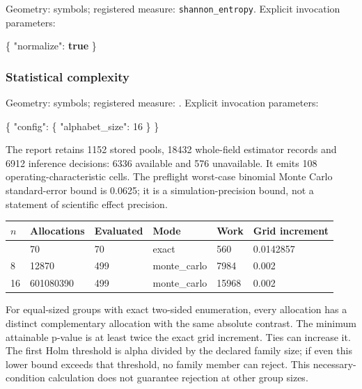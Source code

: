 \documentclass[
  english,
  11pt,
]{article}
\newenvironment{Shaded}{}{}
\newcommand{\DataTypeTok}[1]{\textcolor[rgb]{0.56,0.13,0.00}{#1}}
\newcommand{\DecValTok}[1]{\textcolor[rgb]{0.25,0.63,0.44}{#1}}
\newcommand{\FunctionTok}[1]{\textcolor[rgb]{0.02,0.16,0.49}{#1}}
\newcommand{\KeywordTok}[1]{\textcolor[rgb]{0.00,0.44,0.13}{\textbf{#1}}}
\newcounter{none} %
\begin{document}
Geometry: symbols; registered measure: \texttt{shannon\_entropy}.
Explicit invocation parameters:

\begin{Shaded}
\begin{Highlighting}[]
\FunctionTok{\{}
  \DataTypeTok{"normalize"}\FunctionTok{:} \KeywordTok{true}
\FunctionTok{\}}
\end{Highlighting}
\end{Shaded}

\subsubsection{Statistical complexity}\label{statistical-complexity}

Geometry: symbols; registered measure: .
Explicit invocation parameters:

\begin{Shaded}
\begin{Highlighting}[]
\FunctionTok{\{}
  \DataTypeTok{"config"}\FunctionTok{:} \FunctionTok{\{}
    \DataTypeTok{"alphabet\_size"}\FunctionTok{:} \DecValTok{16}
  \FunctionTok{\}}
\FunctionTok{\}}
\end{Highlighting}
\end{Shaded}

The report retains 1152 stored pools, 18432 whole-field estimator
records and 6912 inference decisions: 6336 available and 576
unavailable. It emits 108 operating-characteristic cells. The preflight
worst-case binomial Monte Carlo standard-error bound is 0.0625; it is a
simulation-precision bound, not a statement of scientific effect
precision.

{\def\LTcaptype{none} %
\begin{longtable}[]{@{}llllll@{}}
\toprule\noalign{}
\(n\) & Allocations & Evaluated & Mode & Work & Grid increment \\
\midrule\noalign{}
\endhead
\bottomrule\noalign{}
\endlastfoot
4 & 70 & 70 & exact & 560 & 0.0142857 \\
8 & 12870 & 499 & monte\_carlo & 7984 & 0.002 \\
16 & 601080390 & 499 & monte\_carlo & 15968 & 0.002 \\
\end{longtable}
}

For equal-sized groups with exact two-sided enumeration, every
allocation has a distinct complementary allocation with the same
absolute contrast. The minimum attainable p-value is at least twice the
exact grid increment. Ties can increase it. The first Holm threshold is
alpha divided by the declared family size; if even this lower bound
exceeds that threshold, no family member can reject. This
necessary-condition calculation does not guarantee rejection at other
group sizes.
\end{document}
